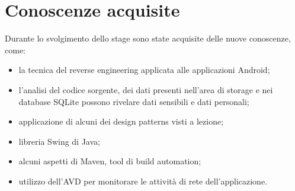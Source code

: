 
\section{Conoscenze acquisite}\label{sec:conoscenze-acquisite}
Durante lo svolgimento dello stage sono state acquisite delle nuove conoscenze, come:
\begin{itemize}\itemsep0em
    \item la tecnica del reverse engineering applicata alle applicazioni Android;
    \item l'analisi del codice sorgente, dei dati presenti nell'area di storage e nei database SQLite possono rivelare dati sensibili e dati personali;
    \item applicazione di alcuni dei design patterns visti a lezione;
    \item libreria Swing di Java;
    \item alcuni aspetti di Maven, tool di build automation;
    \item utilizzo dell'AVD per monitorare le attività di rete dell'applicazione.
\end{itemize}
